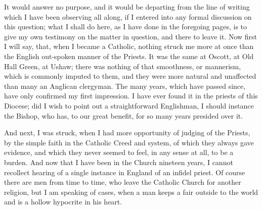 It would answer no purpose, and it would be departing from the line
of writing which I have been observing all along, if I entered into any
formal discussion on this question; what I shall do here, as I
have done in the foregoing pages, is to give my own testimony on the
matter in question, and there to leave it. Now first I will say, that,
when I became a Catholic, nothing struck me more at once than the
English out-spoken manner of the Priests. It was the same at Oscott, at
Old Hall Green, at Ushaw; there was nothing of that smoothness, or
mannerism, which is commonly imputed to them, and they were more natural
and unaffected than many an Anglican clergyman. The many years, which
have passed since, have only confirmed my first impression. I have ever
found it in the priests of this Diocese; did I wish to point out a
straightforward Englishman, I should instance the Bishop, who has, to
our great benefit, for so many years presided over it.

And next, I was struck, when I had more opportunity of judging of the
Priests, by the simple faith in the Catholic Creed and system, of which
they always gave evidence, and which they never seemed to feel, in any
sense at all, to be a burden. And now that I have been in the Church
nineteen years, I cannot recollect hearing of a single instance in
England of an infidel priest. Of course there are men from time to time,
who leave the Catholic Church for another religion, but I am speaking of
cases, when a man keeps a fair outside to the world and is a
hollow hypocrite in his heart.

